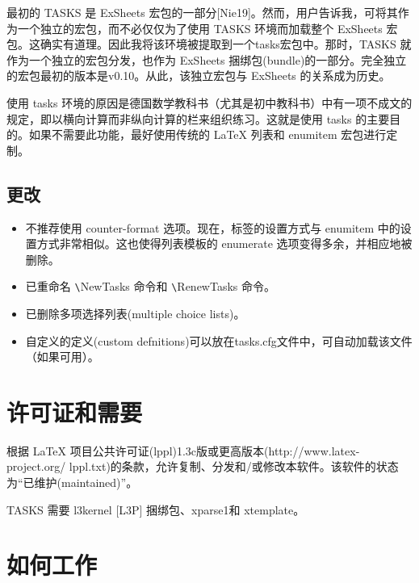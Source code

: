 \documentclass[a4paper,12pt,indent]{article}
\begin{document}
最初的 \textcolor{Tasks}{TASKS} 是 \textcolor{Tasks}{ExSheets} 宏包的一部分[Nie19]。然而，用户告诉我，可将其作为一个独立的宏包，而不必仅仅为了使用 \textcolor{Tasks}{TASKS} 环境而加载整个 \textcolor{Tasks}{ExSheets} 宏包。这确实有道理。因此我将该环境被提取到一个tasks宏包中。那时，\textcolor{Tasks}{TASKS} 就作为一个独立的宏包分发，也作为 \textcolor{Tasks}{ExSheets} 捆绑包(bundle)的一部分。完全独立的宏包最初的版本是v0.10。从此，该独立宏包与 \textcolor{Tasks}{ExSheets} 的关系成为历史。

使用 tasks 环境的原因是德国数学教科书（尤其是初中教科书）中有一项不成文的规定，即以横向计算而非纵向计算的栏来组织练习。这就是使用 tasks 的主要目的。如果不需要此功能，最好使用传统的 \LaTeX{} 列表和 enumitem 宏包进行定制。

\subsection*{更改}

\begin{itemize}

 \item 不推荐使用 counter-format 选项。现在，标签的设置方式与 enumitem 中的设置方式非常相似。这也使得列表模板的 enumerate 选项变得多余，并相应地被删除。

\item 已重命名 \verb|\|\textcolor{Tasks}{NewTasks} 命令和 \verb|\|\textcolor{Tasks}{RenewTasks} 命令。

\item 已删除多项选择列表(multiple choice lists)。

\item 自定义的定义(custom defnitions)可以放在tasks.cfg文件中，可自动加载该文件（如果可用）。

\end{itemize}

\section{许可证和需要}

根据 \LaTeX{} 项目公共许可证(lppl)1.3c版或更高版本(http://www.latex-project.org/ lppl.txt)的条款，允许复制、分发和/或修改本软件。该软件的状态为“已维护(maintained)”。

\textcolor{Tasks}{TASKS} 需要 l3kernel [L3P] 捆绑包、xparse1和 xtemplate。

\section{如何工作}
\end{document}

